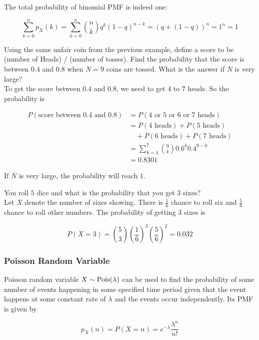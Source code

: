 The total probability of binomial PMF is indeed one:

$$\sum_{k=0}^{n} p_X(k) = \sum_{k=0}^{n} {n \choose k} q^k(1-q)^{n-k} = (q+(1-q))^n=1^n=1$$

\begin{texample}
	Using the same unfair coin from the previous example, define a score to be (number of Heads) / (number of tosses). Find the probability that the score is between $0.4$ and $0.8$ when $N=9$ coins are tossed. What is the answer if $N$ is very large? \\
	
	To get the score between $0.4$ and $0.8$, we need to get $4$ to $7$ heads. So the probability is
	
	\begin{align*}
		P(\text{score between 0.4 and 0.8})&=P(\text{4 or 5 or 6 or 7 heads}) \\
		&= P(\text{4 heads})+P(\text{5 heads}) \\
		&\quad + P(\text{6 heads})+P(\text{7 heads}) \\
		&= \sum_{k=4}^7 \binom{9}{k}0.6^k0.4^{9-k} \\
		&= 0.8301
	\end{align*}
	
	If $N$ is very large, the probability will reach $1$.
\end{texample}

\begin{texample}
	You roll $5$ dice and what is the probability that you get $3$ sixes? \\
	
	Let $X$ denote the number of sixes showing. There is $\frac16$ chance to roll six and $\frac56$ chance to roll other numbers. The probability of getting $3$ sixes is
	
	$$P(X=3)={5\choose3}\left(\frac16\right)^3\left(\frac56\right)^2=0.032$$
\end{texample}

\subsubsection{Poisson Random Variable}

Poisson random variable $X\sim\operatorname{Pois}(\lambda)$ can be used to find the probability of some number of events happening in some specified time period given that the event happens at some constant rate of $\lambda$ and the events occur independently. Its PMF is given by

$$p_X(n)=P(X=n)=e^{-\lambda}\frac{\lambda^n}{n!}$$

